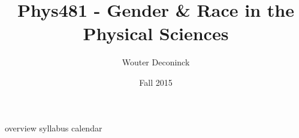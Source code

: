 \documentclass{article}
\title{Phys481 - Gender \& Race in the Physical Sciences}
\author{Wouter Deconinck}
\date{Fall 2015}
\begin{document}
\maketitle

{overview}
{syllabus}
{calendar}
\end{document}

